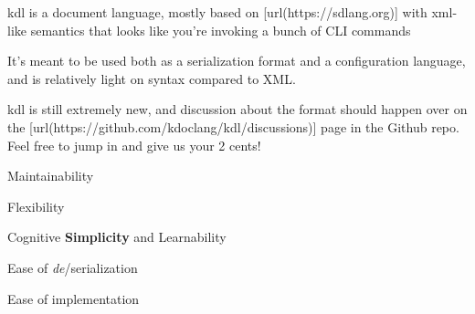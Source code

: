 \startsectionlevel[title={kdl - Kat's Document
Language},reference={kdl---kats-document-language}]

\stopsectionlevel

%
kdl is a document language, mostly based on
[url(https://sdlang.org)] with xml-like semantics that
looks like you're invoking a bunch of CLI commands

It's meant to be used both as a serialization format and a configuration
language, and is relatively light on syntax compared to XML.

\startsectionlevel[title={Design and
Discussion},reference={design-and-discussion}]

kdl is still extremely new, and discussion about the format should
happen over on the
[url(https://github.com/kdoclang/kdl/discussions)]
page in the Github repo. Feel free to jump in and give us your 2 cents!

\stopsectionlevel

\startsectionlevel[title={Design
Principles},reference={design-principles}]

\startenumerate[n,packed]
\item
  Maintainability
\item
  Flexibility
\item
  Cognitive {\bf Simplicity} and Learnability
\item
  Ease of {\em de}/serialization
\item
  Ease of implementation
\stopenumerate

\stopsectionlevel
